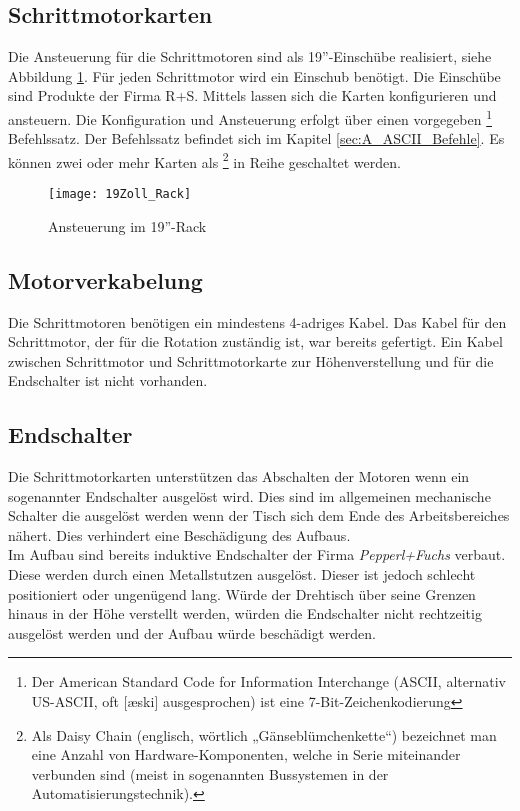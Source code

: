 \subsection{Schrittmotorkarten}
\label{sec:Schrittmotorkarten}
Die Ansteuerung für die Schrittmotoren sind als 19''-Einschübe realisiert, siehe Abbildung \ref{fig:19Zoll_Rack}. Für jeden Schrittmotor wird ein Einschub benötigt.
Die Einschübe sind Produkte der Firma R+S. Mittels  lassen sich die Karten konfigurieren und ansteuern. Die Konfiguration und Ansteuerung erfolgt über einen vorgegeben 
\footnote{Der American Standard Code for Information Interchange (ASCII, alternativ US-ASCII, oft [æski] ausgesprochen) ist eine 7-Bit-Zeichenkodierung\cite{wiki:ASCII}}
 Befehlssatz. Der Befehlssatz befindet sich im Kapitel \ref{sec:A_ASCII_Befehle}. Es können zwei oder mehr Karten als 
\footnote{Als Daisy Chain (englisch, wörtlich „Gänseblümchenkette“) bezeichnet man eine Anzahl von Hardware-Komponenten, welche in Serie miteinander verbunden sind (meist in sogenannten Bussystemen in der Automatisierungstechnik).\cite{wiki:Daisy} } 
in Reihe geschaltet werden.
\begin{figure}[h]
\centering
\texttt{[image: 19Zoll\_Rack]}
\caption{Ansteuerung im 19''-Rack}
\label{fig:19Zoll_Rack}
\end{figure}
\subsection{Motorverkabelung}
\label{sec:Motorverkabelung}
Die Schrittmotoren benötigen ein mindestens 4-adriges Kabel. Das Kabel für den Schrittmotor, der für die Rotation zuständig ist, war bereits gefertigt. Ein Kabel zwischen Schrittmotor und Schrittmotorkarte zur Höhenverstellung und für die Endschalter ist nicht vorhanden. 


\subsection{Endschalter}
\label{sec:Endschalter}
Die Schrittmotorkarten unterstützen das Abschalten der Motoren wenn ein sogenannter Endschalter ausgelöst wird. Dies sind im allgemeinen mechanische Schalter die ausgelöst werden wenn der Tisch sich dem Ende des Arbeitsbereiches nähert. Dies verhindert eine Beschädigung des Aufbaus.\\
Im Aufbau sind bereits induktive Endschalter der Firma \textit{Pepperl+Fuchs} verbaut. Diese werden durch einen Metallstutzen ausgelöst. Dieser ist jedoch schlecht positioniert oder ungenügend lang. Würde der Drehtisch über seine Grenzen hinaus in der Höhe verstellt werden, würden die Endschalter nicht rechtzeitig ausgelöst werden und der Aufbau würde beschädigt werden.


